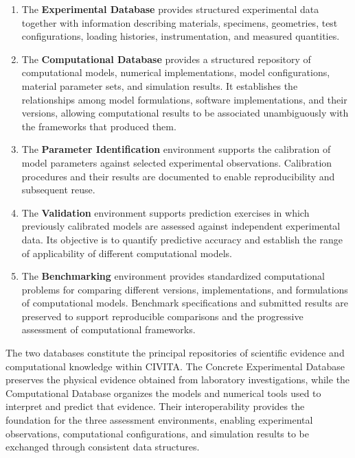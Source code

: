 \documentclass[11pt]{book}
\begin{document}
\begin{enumerate}
    \item The \textbf{Experimental Database} provides structured experimental data together with information describing materials, specimens, geometries, test configurations, loading histories, instrumentation, and measured quantities.

    \item The \textbf{Computational Database} provides a structured repository of computational models, numerical implementations, model configurations, material parameter sets, and simulation results. It establishes the relationships among model formulations, software implementations, and their versions, allowing computational results to be associated unambiguously with the frameworks that produced them.

    \item The \textbf{Parameter Identification} environment supports the calibration of model parameters against selected experimental observations. Calibration procedures and their results are documented to enable reproducibility and subsequent reuse.

    \item The \textbf{Validation} environment supports prediction exercises in which previously calibrated models are assessed against independent experimental data. Its objective is to quantify predictive accuracy and establish the range of applicability of different computational models.

    \item The \textbf{Benchmarking} environment provides standardized computational problems for comparing different versions, implementations, and formulations of computational models. Benchmark specifications and submitted results are preserved to support reproducible comparisons and the progressive assessment of computational frameworks.
\end{enumerate}

The two databases constitute the principal repositories of scientific evidence and computational knowledge within CIVITA. The Concrete Experimental Database preserves the physical evidence obtained from laboratory investigations, while the Computational Database organizes the models and numerical tools used to interpret and predict that evidence. Their interoperability provides the foundation for the three assessment environments, enabling experimental observations, computational configurations, and simulation results to be exchanged through consistent data structures.
\end{document}
